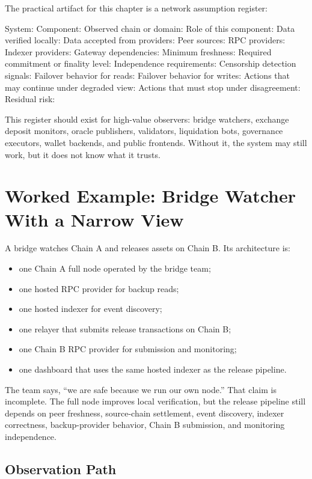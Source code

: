 The practical artifact for this chapter is a network assumption register:

\begin{codeblock}
System:
Component:
Observed chain or domain:
Role of this component:
Data verified locally:
Data accepted from providers:
Peer sources:
RPC providers:
Indexer providers:
Gateway dependencies:
Minimum freshness:
Required commitment or finality level:
Independence requirements:
Censorship detection signals:
Failover behavior for reads:
Failover behavior for writes:
Actions that may continue under degraded view:
Actions that must stop under disagreement:
Residual risk:
\end{codeblock}

This register should exist for high-value observers: bridge watchers, exchange deposit monitors, oracle publishers, validators, liquidation bots, governance executors, wallet backends, and public frontends. Without it, the system may still work, but it does not know what it trusts.

\section{Worked Example: Bridge Watcher With a Narrow View}

A bridge watches Chain A and releases assets on Chain B. Its architecture is:

\begin{itemize}
\item one Chain A full node operated by the bridge team;
\item one hosted RPC provider for backup reads;
\item one hosted indexer for event discovery;
\item one relayer that submits release transactions on Chain B;
\item one Chain B RPC provider for submission and monitoring;
\item one dashboard that uses the same hosted indexer as the release pipeline.
\end{itemize}

The team says, ``we are safe because we run our own node.'' That claim is incomplete. The full node improves local verification, but the release pipeline still depends on peer freshness, source-chain settlement, event discovery, indexer correctness, backup-provider behavior, Chain B submission, and monitoring independence.

\subsection{Observation Path}

